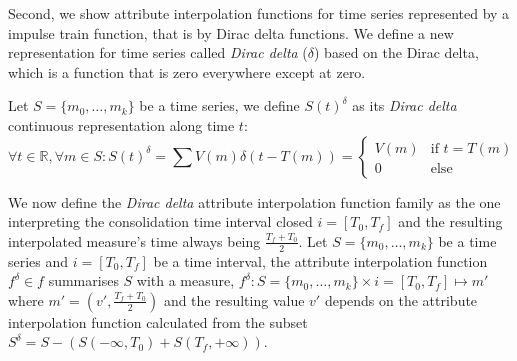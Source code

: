 Second, we show attribute interpolation functions for time series
represented by a impulse train function, that is by Dirac delta
functions.  We define a new representation for time series called
\emph{Dirac delta} ($\delta$) based on the Dirac delta, which is a
function that is zero everywhere except at zero.

Let $S=\{m_0,\ldots,m_k\}$ be a time series, we define $S(t)^{\delta}$
as its \emph{Dirac delta} continuous representation along time $t$:
\[
\forall t \in \mathbb{R}  ,\forall m \in S:
S(t)^{\delta} =  \sum V(m)\delta(t-T(m)) =
\begin{cases}
  V(m) & \text{if }  t=T(m) \\
  0 & \text{else} 
\end{cases}
\]

We now define the \emph{Dirac delta} attribute interpolation function
family as the one interpreting the consolidation time interval closed
$i=[T_0,T_f]$ and the resulting interpolated measure's time always
being $\frac{T_f+T_0}{2}$.  Let $S=\{m_0,\ldots,m_k\}$ be a time
series and $i=[T_0,T_f]$ be a time interval, the attribute
interpolation function $f^{\delta}\in f$ summarises $S$ with a
measure, $f^{\delta}: S=\{m_0,\ldots,m_k\} \times i=[T_0,T_f] \mapsto
m'$ where $m'=(v',\frac{T_f+T_0}{2})$ and the resulting value
$v'$ depends on the attribute interpolation function calculated from
the subset $S^{\delta}=S-(S(-\infty,T_0)+S(T_f,+\infty))$.

